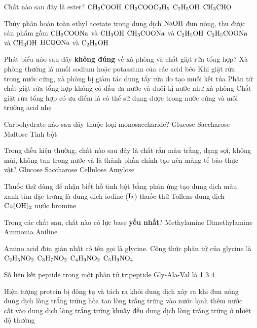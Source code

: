 \documentclass[11pt,a4paper]{article}
\begin{document}
\begin{ex}
Chất nào sau đây là ester?
\choice
{$\ce{CH3COOH}$}
{\True $\ce{CH3COOC2H5}$}
{$\ce{C2H5OH}$}
{$\ce{CH3CHO}$}
\end{ex}
\begin{ex}
Thủy phân hoàn toàn ethyl acetate trong dung dịch $\ce{NaOH}$ đun nóng, thu được sản phẩm gồm
\choice
{$\ce{CH3COONa}$ và $\ce{CH3OH}$}
{\True $\ce{CH3COONa}$ và $\ce{C2H5OH}$}
{$\ce{C2H5COONa}$ và $\ce{CH3OH}$}
{$\ce{HCOONa}$ và $\ce{C2H5OH}$}
\end{ex}
\begin{ex}
Phát biểu nào sau đây \textbf{không đúng} về xà phòng và chất giặt rửa tổng hợp?
\choice
{Xà phòng thường là muối sodium hoặc potassium của các acid béo}
{Khi giặt rửa trong nước cứng, xà phòng bị giảm tác dụng tẩy rửa do tạo muối kết tủa}
{\True Phân tử chất giặt rửa tổng hợp không có đầu ưa nước và đuôi kị nước như xà phòng}
{Chất giặt rửa tổng hợp có ưu điểm là có thể sử dụng được trong nước cứng và môi trường acid nhẹ}
\end{ex}
\begin{ex}
Carbohydrate nào sau đây thuộc loại monosaccharide?
\choice
{\True Glucose}
{Saccharose}
{Maltose}
{Tinh bột}
\end{ex}
\begin{ex}
Trong điều kiện thường, chất nào sau đây là chất rắn màu trắng, dạng sợi, không mùi, không tan trong nước và là thành phần chính tạo nên màng tế bào thực vật?
\choice
{Glucose}
{Saccharose}
{\True Cellulose}
{Amylose}
\end{ex}
\begin{ex}
Thuốc thử dùng để nhận biết hồ tinh bột bằng phản ứng tạo dung dịch màu xanh tím đặc trưng là
\choice
{\True dung dịch iodine ($\ce{I2}$)}
{thuốc thử Tollens}
{dung dịch $\ce{Cu(OH)2}$}
{nước bromine}
\end{ex}
\begin{ex}
Trong các chất sau, chất nào có lực base \textbf{yếu nhất}?
\choice
{Methylamine}
{Dimethylamine}
{Ammonia}
{\True Aniline}
\end{ex}
\begin{ex}
Amino acid đơn giản nhất có tên gọi là glycine. Công thức phân tử của glycine là
\choice
{\True $\ce{C2H5NO2}$}
{$\ce{C3H7NO2}$}
{$\ce{C4H9NO2}$}
{$\ce{C5H9NO4}$}
\end{ex}
\begin{ex}
Số liên kết peptide trong một phân tử tripeptide Gly-Ala-Val là
\choice
{1}
{}
{3}
{4}
\end{ex}
\begin{ex}
Hiện tượng protein bị đông tụ và tách ra khỏi dung dịch xảy ra khi
\choice
{\True đun nóng dung dịch lòng trắng trứng}
{hòa tan lòng trắng trứng vào nước lạnh}
{thêm nước cất vào dung dịch lòng trắng trứng}
{khuấy đều dung dịch lòng trắng trứng ở nhiệt độ thường}
\end{ex}
\end{document}
